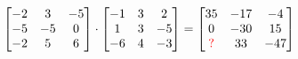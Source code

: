 \documentclass[border=5pt]{standalone}
\begin{document}
      $\begin{bmatrix} -2 & 3 & -5 \\ -5 & -5 & 0 \\ -2 & 5 & 6 \end{bmatrix} \cdot \begin{bmatrix} -1 & 3 & 2 \\ 1 & 3 & -5 \\ -6 & 4 & -3 \end{bmatrix} = \begin{bmatrix} 35 & -17 & -4 \\ 0 & -30 & 15 \\ \textcolor{red}{?} & 33 & -47 \end{bmatrix}$
      
\end{document}
